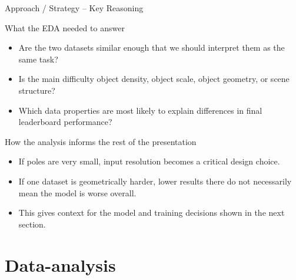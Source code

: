 \documentclass[aspectratio=169]{beamer}
\begin{document}
\begin{frame}{Approach / Strategy -- Key Reasoning}
  \begin{block}{What the EDA needed to answer}
    \begin{itemize}
      \item Are the two datasets similar enough that we should interpret them as the same task?
      \item Is the main difficulty object density, object scale, object geometry, or scene structure?
      \item Which data properties are most likely to explain differences in final leaderboard performance?
    \end{itemize}
  \end{block}

  \begin{block}{How the analysis informs the rest of the presentation}
    \begin{itemize}
      \item If poles are very small, input resolution becomes a critical design choice.
      \item If one dataset is geometrically harder, lower results there do not necessarily mean the model is worse overall.
      \item This gives context for the model and training decisions shown in the next section.
    \end{itemize}
  \end{block}
\end{frame}

\section{Data-analysis}
\end{document}
